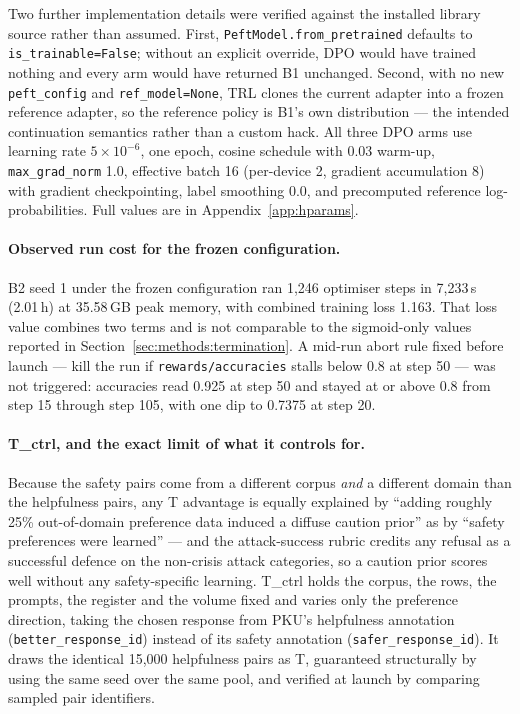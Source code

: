 Two further implementation details were verified against the installed library source
rather than assumed. First, \texttt{PeftModel.from\_pretrained} defaults to
\texttt{is\_trainable=False}; without an explicit override, DPO would have trained
nothing and every arm would have returned B1 unchanged. Second, with no new
\texttt{peft\_config} and \texttt{ref\_model=None}, TRL clones the current adapter into a
frozen reference adapter, so the reference policy is B1's own distribution --- the
intended continuation semantics rather than a custom hack. All three DPO arms use
learning rate $5\times10^{-6}$, one epoch, cosine schedule with 0.03 warm-up,
\texttt{max\_grad\_norm} 1.0, effective batch 16 (per-device 2, gradient accumulation 8)
with gradient checkpointing, label smoothing 0.0, and precomputed reference
log-probabilities. Full values are in Appendix~\ref{app:hparams}.

\paragraph{Observed run cost for the frozen configuration.} B2 seed 1 under the frozen
configuration ran 1{,}246 optimiser steps in 7{,}233\,s (2.01\,h) at 35.58\,GB peak
memory, with combined training loss 1.163. That loss value combines two terms and is not
comparable to the sigmoid-only values reported in
Section~\ref{sec:methods:termination}. A mid-run abort rule fixed before launch --- kill
the run if \texttt{rewards/accuracies} stalls below 0.8 at step 50 --- was not triggered:
accuracies read 0.925 at step 50 and stayed at or above 0.8 from step 15 through step 105,
with one dip to 0.7375 at step 20.

\paragraph{T\_ctrl, and the exact limit of what it controls for.} Because the safety
pairs come from a different corpus \emph{and} a different domain than the helpfulness
pairs, any T advantage is equally explained by ``adding roughly 25\% out-of-domain
preference data induced a diffuse caution prior'' as by ``safety preferences were
learned'' --- and the attack-success rubric credits any refusal as a successful defence
on the non-crisis attack categories, so a caution prior scores well without any
safety-specific learning. T\_ctrl holds the corpus, the rows, the prompts, the register
and the volume fixed and varies only the preference direction, taking the chosen response
from PKU's helpfulness annotation (\texttt{better\_response\_id}) instead of its safety
annotation (\texttt{safer\_response\_id}). It draws the identical 15{,}000 helpfulness
pairs as T, guaranteed structurally by using the same seed over the same pool, and
verified at launch by comparing sampled pair identifiers.

